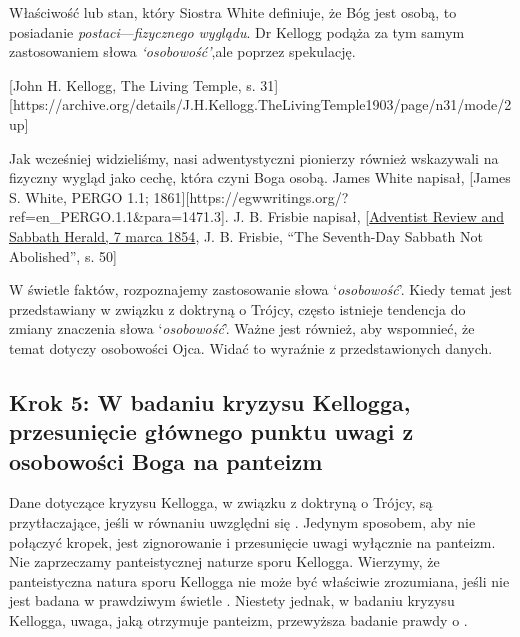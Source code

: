 Właściwość lub stan, który Siostra White definiuje, że Bóg jest osobą, to posiadanie \textit{postaci}—\textit{fizycznego wyglądu}. Dr Kellogg podąża za tym samym zastosowaniem słowa \textit{‘osobowość’},ale poprzez spekulację.

[John H. Kellogg, The Living Temple, s. 31][https://archive.org/details/J.H.Kellogg.TheLivingTemple1903/page/n31/mode/2up]

Jak wcześniej widzieliśmy, nasi adwentystyczni pionierzy również wskazywali na fizyczny wygląd jako cechę, która czyni Boga osobą. James White napisał, [James S. White, PERGO 1.1; 1861][https://egwwritings.org/?ref=en\_PERGO.1.1&para=1471.3]. J. B. Frisbie napisał, [\href{https://documents.adventistarchives.org/Periodicals/RH/RH18540307-V05-07.pdf}{Adventist Review and Sabbath Herald, 7 marca 1854}, J. B. Frisbie, “The Seventh-Day Sabbath Not Abolished”, s. 50]

W świetle faktów, rozpoznajemy zastosowanie słowa ‘\textit{osobowość}’. Kiedy temat  jest przedstawiany w związku z doktryną o Trójcy, często istnieje tendencja do zmiany znaczenia słowa ‘\textit{osobowość}’. Ważne jest również, aby wspomnieć, że temat  dotyczy osobowości Ojca. Widać to wyraźnie  z przedstawionych danych.

\subsection*{Krok 5: W badaniu kryzysu Kellogga, przesunięcie głównego punktu uwagi z osobowości Boga na panteizm}

Dane dotyczące kryzysu Kellogga, w związku z doktryną o Trójcy, są przytłaczające, jeśli w równaniu uwzględni się  . Jedynym sposobem, aby nie połączyć kropek, jest zignorowanie  i przesunięcie uwagi wyłącznie na panteizm. Nie zaprzeczamy panteistycznej naturze sporu Kellogga. Wierzymy, że panteistyczna natura sporu Kellogga nie może być właściwie zrozumiana, jeśli nie jest badana w prawdziwym świetle . Niestety jednak, w badaniu kryzysu Kellogga, uwaga, jaką otrzymuje panteizm, przewyższa badanie prawdy o .

